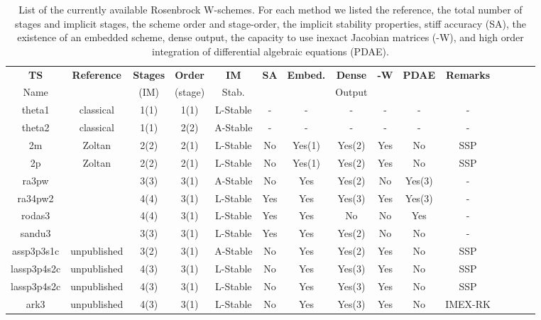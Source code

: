 %
\begin{table}
\centering
{\scriptsize
\begin{tabular}{ccccccccccccccc}
{\bf TS} &{\bf Reference}& {\bf Stages} &{\bf Order}&{\bf IM}     &{\bf SA}&{\bf Embed.}&{\bf Dense}&{\bf -W}&{\bf PDAE} &{\bf Remarks}\\
Name &  &(IM)   &(stage)&Stab.&&      &Output&&&\\
\hline
theta1& classical&
1(1)&1(1)&L-Stable&-&-&-&-&-&-\\
theta2& classical&
1(1)&2(2)&A-Stable&-&-&-&-&-&-\\
2m             &Zoltan&
2(2)&2(1)&L-Stable&No&Yes(1)&Yes(2)&Yes&No&SSP\\
2p             &Zoltan&
2(2)&2(1)&L-Stable&No&Yes(1)&Yes(2)&Yes&No&SSP\\
ra3pw          &\cite{Rang_2005}&
3(3)&3(1)&A-Stable&No&Yes&Yes(2)&No&Yes(3)&-\\
ra34pw2        &\cite{Rang_2005}&
4(4)&3(1)&L-Stable&Yes&Yes&Yes(3)&Yes&Yes(3)&-\\
rodas3         &\cite{Sandu_1997}&
4(4)&3(1)&L-Stable&Yes&Yes&No&No&Yes&-\\
sandu3         &\cite{Sandu_1997}&
3(3)&3(1)&L-Stable&Yes&Yes&Yes(2)&No&No&-\\
assp3p3s1c &unpublished&
3(2)&3(1)&A-Stable&No&Yes&Yes(2)&Yes&No&SSP\\
lassp3p4s2c&unpublished&
4(3)&3(1)&L-Stable&No&Yes&Yes(3)&Yes&No&SSP\\
lassp3p4s2c&unpublished&
4(3)&3(1)&L-Stable&No&Yes&Yes(3)&Yes&No&SSP\\
ark3       &unpublished&
4(3)&3(1)&L-Stable&No&Yes&Yes(3)&Yes&No&IMEX-RK\\
\hline
\end{tabular}}
\caption{\label{tab_IMEX_RosW_PETSc}List
of the currently available Rosenbrock W-schemes. For each method we listed the reference, the total number
  of stages and implicit stages, the scheme order and stage-order,
  the implicit stability properties, stiff accuracy (SA), the
  existence of an embedded scheme, dense output, the capacity to use
  inexact Jacobian matrices (-W), and high order integration of differential
  algebraic equations (PDAE).}
\end{table}
%
